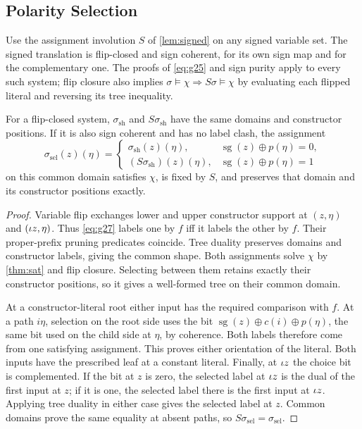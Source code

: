 \subsection{Polarity Selection}\label{sec:selector}
Use the assignment involution $S$ of \cref{lem:signed} on any signed
variable set. The signed translation is flip-closed and sign coherent, for
its own sign map and for the complementary one.
The proofs of \eqref{eq:g25} and sign purity apply to every such system;
flip closure also implies $\sigma\models\chi\Rightarrow S\sigma\models\chi$
by evaluating each flipped literal and reversing its tree inequality.

\begin{lemma}\label{lem:selector}
For a flip-closed system, $\sigma_{\mathrm{sh}}$ and
$S\sigma_{\mathrm{sh}}$ have the same domains and constructor positions.
If it is also sign coherent and has no label clash, the assignment
\begin{equation}\label{eq:g60}
 \sigma_{\mathrm{sel}}(z)(\eta)=
 \begin{cases}
 \sigma_{\mathrm{sh}}(z)(\eta),&\operatorname{sg}(z)\oplus p(\eta)=0,\\
 (S\sigma_{\mathrm{sh}})(z)(\eta),&\operatorname{sg}(z)\oplus p(\eta)=1
 \end{cases}
\end{equation}
on this common domain satisfies $\chi$, is fixed by $S$, and preserves
that domain and its constructor positions exactly.
\end{lemma}
\begin{proof}
Variable flip exchanges lower and upper constructor support at $(z,\eta)$ and
$(\iota z,\eta)$. Thus \eqref{eq:g27} labels one by $f$ iff it labels the
other by $f$. Their proper-prefix pruning predicates coincide. Tree duality
preserves domains and constructor labels, giving the common shape.
Both assignments solve $\chi$ by \cref{thm:sat} and flip closure.
Selecting between them retains exactly their constructor positions,
so it gives a well-formed tree on their common domain.

At a constructor-literal root either input has the required comparison
with $f$. At a path $i\eta$, selection on the root side uses the bit
$\operatorname{sg}(z)\oplus c(i)\oplus p(\eta)$, the same bit used on
the child side at $\eta$, by coherence. Both labels therefore come from
one satisfying assignment. This proves either orientation of the literal.
Both inputs have the prescribed leaf at a constant literal.
Finally, at $\iota z$ the choice bit is complemented. If the bit at $z$
is zero, the selected label at $\iota z$ is the dual of the first input
at $z$; if it is one, the selected label there is the first input at
$\iota z$. Applying tree duality in either case gives the selected label
at $z$. Common domains prove the same equality at absent paths, so
$S\sigma_{\mathrm{sel}}=\sigma_{\mathrm{sel}}$.
\end{proof}

